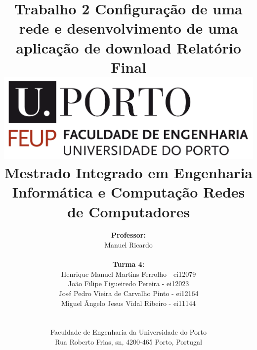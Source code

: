 \documentclass[a4paper]{article}
\begin{document}
\setlength{\textwidth}{16cm}
\setlength{\textheight}{22cm}

\title{\Huge\textbf{Trabalho 2}\linebreak\linebreak\linebreak
\LARGE{Configuração de uma rede e desenvolvimento de uma aplicação de download}\linebreak\linebreak
\Large\textbf{Relatório Final}\linebreak\linebreak
\includegraphics[scale=0.1]{feup-logo.png}\linebreak\linebreak\linebreak
\Large{Mestrado Integrado em Engenharia Informática e Computação} \linebreak\linebreak
\Large{Redes de Computadores}
}
\author{\textbf{Professor:}\\ Manuel Ricardo\\\\\textbf{Turma 4:}\\ Henrique Manuel Martins Ferrolho - ei12079 \\ João Filipe Figueiredo Pereira - ei12023 \\ José Pedro Vieira de Carvalho Pinto - ei12164 \\ Miguel Ângelo Jesus Vidal Ribeiro - ei11144\\\linebreak\linebreak \\
 \\ Faculdade de Engenharia da Universidade do Porto \\ Rua Roberto Frias, s\/n, 4200-465 Porto, Portugal \linebreak\linebreak\linebreak
\linebreak\linebreak\vspace{1cm}}
\maketitle
\thispagestyle{empty}
\end{document}
